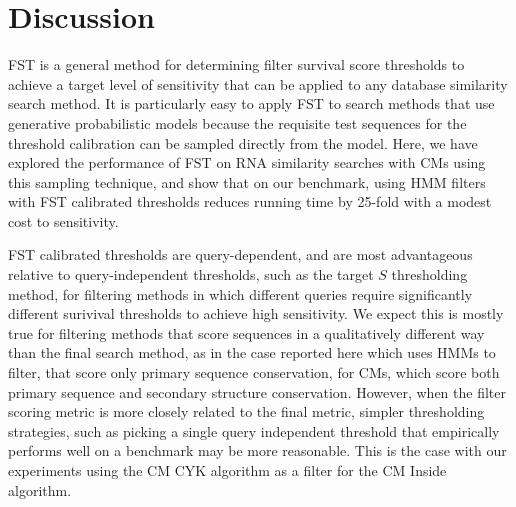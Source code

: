\section{Discussion}

FST is a general method for determining filter survival score
thresholds to achieve a target level of sensitivity that can be
applied to any database similarity search method.  It is particularly
easy to apply FST to search methods that use generative probabilistic
models because the requisite test sequences for the threshold
calibration can be sampled directly from the model. Here, we have
explored the performance of FST on RNA similarity searches with CMs
using this sampling technique, and show that on our benchmark, using
HMM filters with FST calibrated thresholds reduces running time by
25-fold with a modest cost to sensitivity.

\begin{comment}
The slow speed of CM searches been the most serious obstacle to the
use of the \textsc{infernal} software for annotating RNAs in databases
and genomes. Without using filters, running the most sensitive CM
search algorithm with \textsc{infernal} version 1.0 required about
1700 hours to complete our benchmark search of 51 families against
both strands of a 10 Mb database. We have shown that by combining FST
calibrated HMM filters and QDB CYK filters with $F$ and $\beta$
parameters that do not significantly compromise specificity or
sensitivity, the running time drops about 100-fold to about 16 hours.
\end{comment}

FST calibrated thresholds are query-dependent, and are most
advantageous relative to query-independent thresholds, such as the
target $S$ thresholding method, for filtering methods in which
different queries require significantly different surivival thresholds
to achieve high sensitivity. We expect this is mostly true for
filtering methods that score sequences in a qualitatively different
way than the final search method, as in the case reported here which
uses HMMs to filter, that score only primary sequence conservation,
for CMs, which score both primary sequence and secondary structure
conservation. However, when the filter scoring metric is more closely
related to the final metric, simpler thresholding strategies,
such as picking a single query independent threshold that empirically
performs well on a benchmark may be more reasonable. This is the case
with our experiments using the CM CYK algorithm as a filter for the CM
Inside algorithm.

